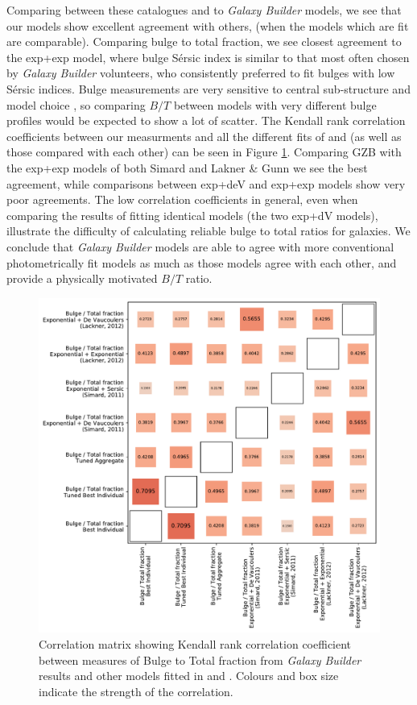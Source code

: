 \documentclass[../main.tex]{subfiles}
\begin{document}
Comparing between these catalogues and to \textit{Galaxy Builder} models, we see that our models show excellent agreement with others, (when the models which are fit are comparable). Comparing bulge to total fraction, we see closest agreement to the exp+exp model, where bulge S\'ersic index is similar to that most often chosen by \textit{Galaxy Builder} volunteers, who consistently preferred to fit bulges with low S\'ersic indices. Bulge measurements are very sensitive to central sub-structure and model choice \citep{Gao2017:1709.00746v1}, so comparing $B/T$ between models with very different bulge profiles would be expected to show a lot of scatter. The Kendall rank correlation coefficients between our measurments and all the different fits of \citet{2011ApJS..196...11S} and \citet{2012MNRAS.421.2277L} (as well as those compared with each other) can be seen in Figure \ref{fig:bt_correlation}. Comparing GZB with the exp+exp models of both Simard and Lakner \& Gunn we see the best agreement, while comparisons between exp+deV and exp+exp models show very poor agreements. The low correlation coefficients in general, even when comparing the results of fitting identical models (the two exp+dV models), illustrate the difficulty of calculating reliable bulge to total ratios for galaxies. We conclude that \textit{Galaxy Builder} models are able to agree with more conventional photometrically fit models as much as those models agree with each other, and provide a physically motivated $B/T$ ratio.

\begin{figure}
  \includegraphics[width=17cm]{images__results/b-t_comparison_correlation.pdf}
  \caption{Correlation matrix showing Kendall rank correlation coefficient between measures of Bulge to Total fraction from \textit{Galaxy Builder} results and other models fitted in \citet{2011ApJS..196...11S} and \citet{2012MNRAS.421.2277L}. Colours and box size indicate the strength of the correlation.}
  \label{fig:bt_correlation}
\end{figure}
\end{document}
